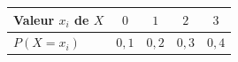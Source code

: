 \begingroup\renewcommand{\arraystretch}{1.35}
\begin{tabular}{@{}lcccc@{}}\toprule
Valeur $x_i$ de $X$ & $0$ & $1$ & $2$ & $3$\\\midrule
$P(X=x_i)$ & $0{,}1$ & $0{,}2$ & $0{,}3$ & $0{,}4$\\
\bottomrule\end{tabular}\endgroup

\par\smallskip{}
